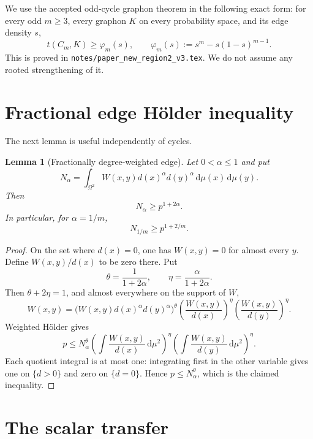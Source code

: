\documentclass[11pt]{article}
\newtheorem{lemma}[theorem]{Lemma}
\newcommand{\dd}{\,\mathrm d}
\begin{document}
We use the accepted odd-cycle graphon theorem in the following exact form:
for every odd $m\geq3$, every graphon $K$ on every probability space, and
its edge density $s$,
\begin{equation}
 t(C_m,K)\geq\varphi_m(s),
 \qquad
 \varphi_m(s):=s^m-s(1-s)^{m-1}.
 \label{eq:odd-cycle-input}
\end{equation}
This is proved in \texttt{notes/paper\_new\_region2\_v3.tex}.  We do not
assume any rooted strengthening of it.


\section{Fractional edge H\"older inequality}

The next lemma is useful independently of cycles.

\begin{lemma}[Fractionally degree-weighted edge]\label{lem:fractional-edge}
Let $0<\alpha\leq1$ and put
\[
 N_\alpha
 =\int_{\Omega^2}W(x,y)d(x)^\alpha d(y)^\alpha
 \dd\mu(x)\dd\mu(y).
\]
Then
\[
 N_\alpha\geq p^{1+2\alpha}.
\]
In particular, for $\alpha=1/m$,
\[
 N_{1/m}\geq p^{1+2/m}.
\]
\end{lemma}

\begin{proof}
On the set where $d(x)=0$, one has $W(x,y)=0$ for almost every $y$.
Define $W(x,y)/d(x)$ to be zero there.  Put
\[
 \theta=\frac1{1+2\alpha},
 \qquad
 \eta=\frac{\alpha}{1+2\alpha}.
\]
Then $\theta+2\eta=1$, and almost everywhere on the support of $W$,
\[
 W(x,y)
 =\bigl(W(x,y)d(x)^\alpha d(y)^\alpha\bigr)^\theta
  \left(\frac{W(x,y)}{d(x)}\right)^\eta
  \left(\frac{W(x,y)}{d(y)}\right)^\eta.
\]
Weighted H\"older gives
\[
 p\leq N_\alpha^\theta
 \left(\int\frac{W(x,y)}{d(x)}\dd\mu^2\right)^\eta
 \left(\int\frac{W(x,y)}{d(y)}\dd\mu^2\right)^\eta.
\]
Each quotient integral is at most one: integrating first in the other
variable gives one on $\{d>0\}$ and zero on $\{d=0\}$.  Hence
$p\leq N_\alpha^\theta$, which is the claimed inequality.
\end{proof}


\section{The scalar transfer}
\end{document}
